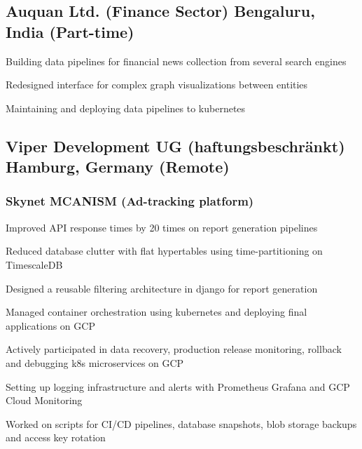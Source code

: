 \documentclass[letter,10pt]{article}
\begin{document}

\subsection{Auquan Ltd. (Finance Sector) \hfill Bengaluru, India (Part-time)}
\begin{zitemize}
\item Building data pipelines for financial news collection from several search engines
\item Redesigned interface for complex graph visualizations between entities
\item Maintaining and deploying data pipelines to kubernetes
\end{zitemize}


\subsection{Viper Development UG (haftungsbeschränkt) \hfill Hamburg, Germany (Remote)}

\vspace{1em}
\subsubsection*{Skynet MCANISM (Ad-tracking platform)}
\begin{zitemize}
\item Improved API response times by 20 times on report generation pipelines
\item Reduced database clutter with flat hypertables using time-partitioning on TimescaleDB
\item Designed a reusable filtering architecture in django for report generation
\item Managed container orchestration using kubernetes and deploying final applications on GCP
\item Actively participated in data recovery, production release monitoring, rollback and debugging k8s microservices on GCP
\item Setting up logging infrastructure and alerts with Prometheus Grafana and GCP Cloud Monitoring
\item Worked on scripts for CI/CD pipelines, database snapshots, blob storage backups and access key rotation
\end{zitemize}
\end{document}
